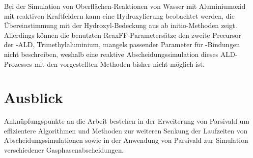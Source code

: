 

Bei der Simulation von Oberflächen-Reaktionen von Wasser mit Aluminiumoxid mit reaktiven Kraftfeldern kann eine Hydroxylierung beobachtet werden, die Übereinstimmung mit der Hydroxyl-Bedeckung aus ab initio-Methoden zeigt.
Allerdings können die benutzten ReaxFF-Parametersätze den zweite Precursor der -ALD, Trimethylaluminium, mangels passender Parameter für -Bindungen nicht beschreiben, weshalb eine reaktive Abscheidungssimulation dieses ALD-Prozesses mit den vorgestellten Methoden bisher nicht möglich ist.

\section{Ausblick}
Anknüpfungspunkte an die Arbeit bestehen in der Erweiterung von Parsivald um effizientere Algorithmen und Methoden zur weiteren Senkung der Laufzeiten von Abscheidungssimulationen sowie in der Anwendung von Parsivald zur Simulation verschiedener Gasphasenabscheidungen.



